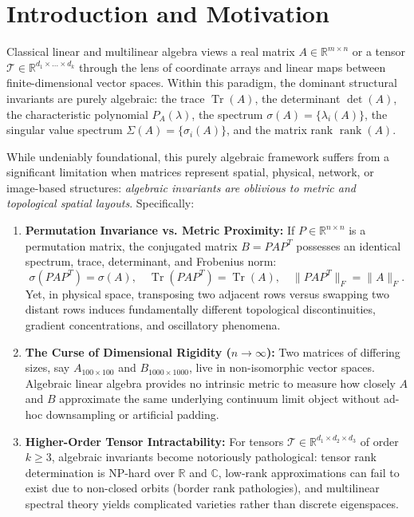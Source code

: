 \documentclass[11pt,a4paper,reqno]{amsart}
\theoremstyle{definition}
\numberwithin{equation}{section}
\newcommand{\R}{\mathbb{R}}
\newcommand{\C}{\mathbb{C}}
\newcommand{\Tr}{\operatorname{Tr}}
\newcommand{\rank}{\operatorname{rank}}
\begin{document}
\maketitle

\tableofcontents

\newpage

\section{Introduction and Motivation}
\label{sec:intro}

Classical linear and multilinear algebra views a real matrix $A \in \R^{m \times n}$ or a tensor $\mathcal{T} \in \R^{d_1 \times \dots \times d_k}$ through the lens of coordinate arrays and linear maps between finite-dimensional vector spaces. Within this paradigm, the dominant structural invariants are purely algebraic: the trace $\Tr(A)$, the determinant $\det(A)$, the characteristic polynomial $P_A(\lambda)$, the spectrum $\sigma(A) = \{\lambda_i(A)\}$, the singular value spectrum $\Sigma(A) = \{\sigma_i(A)\}$, and the matrix rank $\rank(A)$.

While undeniably foundational, this purely algebraic framework suffers from a significant limitation when matrices represent spatial, physical, network, or image-based structures: \emph{algebraic invariants are oblivious to metric and topological spatial layouts}. Specifically:
\begin{enumerate}[label=(\alph*)]
    \item \textbf{Permutation Invariance vs. Metric Proximity:} If $P \in \R^{n \times n}$ is a permutation matrix, the conjugated matrix $B = P A P^T$ possesses an identical spectrum, trace, determinant, and Frobenius norm:
    \begin{equation}
        \sigma(P A P^T) = \sigma(A), \quad \Tr(P A P^T) = \Tr(A), \quad \|P A P^T\|_F = \|A\|_F.
    \end{equation}
    Yet, in physical space, transposing two adjacent rows versus swapping two distant rows induces fundamentally different topological discontinuities, gradient concentrations, and oscillatory phenomena.
    \item \textbf{The Curse of Dimensional Rigidity ($n \to \infty$):} Two matrices of differing sizes, say $A_{100 \times 100}$ and $B_{1000 \times 1000}$, live in non-isomorphic vector spaces. Algebraic linear algebra provides no intrinsic metric to measure how closely $A$ and $B$ approximate the same underlying continuum limit object without ad-hoc downsampling or artificial padding.
    \item \textbf{Higher-Order Tensor Intractability:} For tensors $\mathcal{T} \in \R^{d_1 \times d_2 \times d_3}$ of order $k \ge 3$, algebraic invariants become notoriously pathological: tensor rank determination is NP-hard over $\R$ and $\C$, low-rank approximations can fail to exist due to non-closed orbits (border rank pathologies), and multilinear spectral theory yields complicated varieties rather than discrete eigenspaces.
\end{enumerate}
\end{document}
